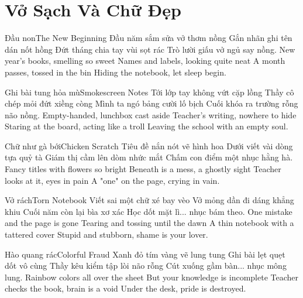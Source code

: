 \chapter{Vở Sạch Và Chữ Đẹp}

\begin{tutuyetbox}{Đầu non}{The New Beginning}
Đầu năm sắm sửa vở thơm nồng
Gắn nhãn ghi tên dán nốt hồng
Đứt tháng chia tay vùi sọt rác
Trò lười giấu vở ngủ say nồng.
\tcblower
New year's books, smelling so sweet 
Names and labels, looking quite neat 
A month passes, tossed in the bin 
Hiding the notebook, let sleep begin.
\end{tutuyetbox}

\begin{tutuyetbox}{Ghi bài tung hỏa mù}{Smokescreen Notes}
Tới lớp tay không vứt cặp lồng
Thầy cô chép mỏi đứt xiềng còng
Mình ta ngó bảng cười lố bịch
Cuối khóa ra trường rỗng não nồng.
\tcblower
Empty-handed, lunchbox cast aside 
Teacher's writing, nowhere to hide 
Staring at the board, acting like a troll 
Leaving the school with an empty soul.
\end{tutuyetbox}

\begin{tutuyetbox}{Chữ như gà bới}{Chicken Scratch}
Tiêu đề nắn nót vẽ hình hoa
Dưới viết vài dòng tựa quỷ tà
Giám thị cầm lên dòm nhức mắt
Chấm con điểm một nhục hằng hà.
\tcblower
Fancy titles with flowers so bright
Beneath is a mess, a ghostly sight
Teacher looks at it, eyes in pain
A "one" on the page, crying in vain.
\end{tutuyetbox}

\begin{tutuyetbox}{Vở rách}{Torn Notebook}
Viết sai một chữ xé bay vèo
Vở mỏng dần đi dáng khẳng khiu
Cuối năm còn lại bìa xơ xác
Học dốt mặt lì... nhục bám theo.
\tcblower
One mistake and the page is gone
Tearing and tossing until the dawn
A thin notebook with a tattered cover
Stupid and stubborn, shame is your lover.
\end{tutuyetbox}

\begin{tutuyetbox}{Hào quang rác}{Colorful Fraud}
Xanh đỏ tím vàng vẽ lung tung
Ghi bài lẹt quẹt dốt vô cùng
Thầy kêu kiểm tập lòi não rỗng
Cút xuống gầm bàn... nhục mông lung.
\tcblower
Rainbow colors all over the sheet
But your knowledge is incomplete
Teacher checks the book, brain is a void
Under the desk, pride is destroyed.
\end{tutuyetbox}


